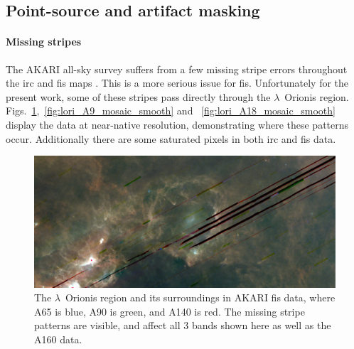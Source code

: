       \subsection{Point-source and artifact masking}

        \paragraph{Missing stripes}
          The AKARI all-sky survey suffers from a few missing stripe errors throughout the \acrshort{irc} and \acrshort{fis} maps \citep{ishihara10, doi15}. This is a more serious issue for \acrshort{fis}. Unfortunately for the present work, some of these stripes pass directly through the $\lambda$~Orionis region. Figs.~\ref{fig:LOri_FIS_color},~\ref{fig:lori_A9_mosaic_smooth} and ~\ref{fig:lori_A18_mosaic_smooth} display the data at near-native resolution, demonstrating where these patterns occur. Additionally there are some saturated pixels in both \acrshort{irc} and \acrshort{fis} data.
            \begin{figure}
              \includegraphics[width=\textwidth]{../Plots/ch_lori/lori_fis_rgb.pdf}
              \centering
              \caption{The $\lambda$~Orionis region and its surroundings in AKARI \acrshort{fis} data, where A65 is blue, A90 is green, and A140 is red. The missing stripe patterns are visible, and affect all 3 bands shown here as well as the A160 data. }
              \label{fig:LOri_FIS_color}
            \end{figure}
